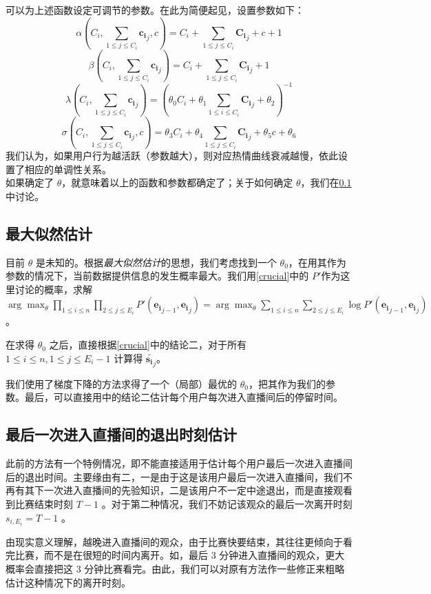 \documentclass{article} %
\begin{document}
可以为上述函数设定可调节的参数。在此为简便起见，设置参数如下：\\
$$
\alpha(C_i,\sum_{1\leq j \leq C_i}\mathbf{c_i}_j,c)=C_i+\sum_{1\leq j\leq C_i}\mathbf{C_i}_j+c+1
$$
$$
\beta(C_i,\sum_{1\leq j \leq C_i}\mathbf{c_i}_j)=C_i+\sum_{1\leq j\leq C_i}\mathbf{C_i}_j+1
$$
$$
\lambda(C_i,\sum_{1\leq j \leq C_i}\mathbf{c_i}_j)=(\theta_0C_i+\theta_1\sum_{1\leq i\leq C_i}\mathbf{C_i}_j+\theta_2)^{-1}
$$
$$
\sigma(C_i,\sum_{1\leq j \leq C_i}\mathbf{c_i}_j,c)=\theta_3C_i+\theta_4\sum_{1\leq j \leq C_i}\mathbf{C_i}_j+\theta_5c+\theta_6
$$
我们认为，如果用户行为越活跃（参数越大），则对应热情曲线衰减越慢，依此设置了相应的单调性关系。\\
如果确定了 $\theta$，就意味着以上的函数和参数都确定了；关于如何确定 $\theta$，我们在\ref{estimation}中讨论。

\subsection{最大似然估计}
\label{estimation}

目前 $\theta$ 是未知的。根据\emph{最大似然估计}的思想，我们考虑找到一个 $\theta_0$，在用其作为参数的情况下，当前数据提供信息的发生概率最大。我们用\ref{crucial}中的 $P'$作为这里讨论的概率，求解 $\arg \max_{\theta} \prod_{1\leq i \leq n}\prod_{2\leq j \leq E_i}P'(\mathbf{e_i}_{j-1},\mathbf{e_i}_j)=\arg \max_{\theta} \sum_{1\leq i \leq n}\sum_{2\leq j \leq E_i}\log P'(\mathbf{e_i}_{j-1},\mathbf{e_i}_j)$。

在求得 $\theta_0$ 之后，直接根据\ref{crucial}中的结论二，对于所有 $1\leq i \leq n,1\leq j \leq E_i - 1$ 计算得 $\widetilde{\mathbf{s_i}_j}$。

我们使用了梯度下降的方法求得了一个（局部）最优的 $\theta_0$，把其作为我们的参数。最后，可以直接用\label{crucial}中的结论二估计每个用户每次进入直播间后的停留时间。

\subsection{最后一次进入直播间的退出时刻估计}

此前的方法有一个特例情况，即不能直接适用于估计每个用户最后一次进入直播间后的退出时间。主要缘由有二，一是由于这是该用户最后一次进入直播间，我们不再有其下一次进入直播间的先验知识，二是该用户不一定中途退出，而是直接观看到比赛结束时刻 $T-1$ 。对于第二种情况，我们不妨记该观众的最后一次离开时刻 $s_{i,E_i}=T-1$ 。

由现实意义理解，越晚进入直播间的观众，由于比赛快要结束，其往往更倾向于看完比赛，而不是在很短的时间内离开。如，最后 $3$ 分钟进入直播间的观众，更大概率会直接把这 $3$ 分钟比赛看完。由此，我们可以对原有方法作一些修正来粗略估计这种情况下的离开时刻。
\end{document}
